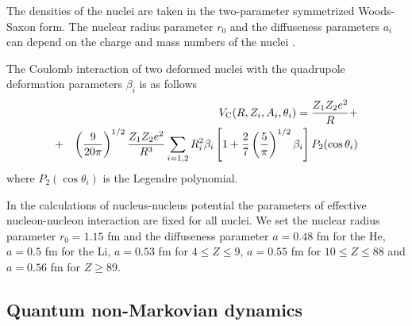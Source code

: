 \documentclass[preprint,review,12pt]{elsarticle}
\begin{document}
  The densities of the nuclei are taken in the two-parameter symmetrized Woods-Saxon form.
  The nuclear radius parameter $r_0$ and the diffuseness parameters $a_i$ can depend on the charge and mass
  numbers of the nuclei \cite{poten}.

  The Coulomb interaction of two deformed nuclei with the quadrupole deformation parameters $\beta_i$
  is as follows
  \begin{eqnarray}
  &&V_{\rm C}(R,Z_i, A_i,\theta_i)=\frac{Z_1 Z_2 e^2}{R}+  \nonumber\\
  &+& 
  \left(\frac{9}{20 \pi}\right)^{1/2}\frac{Z_1 Z_2 e^2}{R^3}\sum_{i=1,2}R_i^2\beta_i\left[1+\frac{2}{7} \left(\frac{5}{\pi}\right)^{1/2} \beta_i\right] P_2(\cos\theta_i)
  \end{eqnarray}
  where $P_2(\cos\theta_i)$ is the Legendre polynomial.

  In the calculations of nucleus-nucleus potential the parameters of effective nucleon-nucleon interaction are fixed for all nuclei. We set the nuclear radius parameter $r_0=1.15$ fm and the diffuseness parameter $a=0.48$ fm for the He, $a=0.5$ fm for the Li, $a=0.53$ fm for $4\leq Z \leq 9$,
  $a=0.55$ fm for $10\leq Z \leq 88$ and $a=0.56$ fm for $Z \geq 89$.


\subsection{Quantum non-Markovian dynamics}
\end{document}

